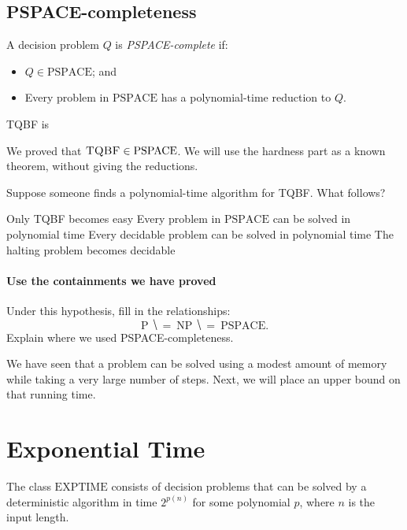 \documentclass[11  pt]{article}
\begin{document}
\newpage
\subsection*{PSPACE-completeness}
A decision problem $Q$ is \emph{PSPACE-complete} if:
\begin{itemize}
    \item $Q\in\mathrm{PSPACE}$; and
    \item Every problem in $\mathrm{PSPACE}$ has a polynomial-time reduction to $Q$.
\end{itemize}

\begin{theorem}
    \textsc{TQBF} is 
\end{theorem}
We proved that $\textsc{TQBF}\in\mathrm{PSPACE}$. We will use the hardness part as a known theorem, without giving the reductions.

\begin{Qu}
    Suppose someone finds a polynomial-time algorithm for \textsc{TQBF}. What follows?
    \begin{itemize}
        \aitem Only \textsc{TQBF} becomes easy
        \bitem Every problem in $\mathrm{PSPACE}$ can be solved in polynomial time
        \citem Every decidable problem can be solved in polynomial time
        \ditem The halting problem becomes decidable
    \end{itemize}
\end{Qu}

\paragraph{Use the containments we have proved}
Under this hypothesis, fill in the relationships:
\begin{equation*}
    \mathrm{P}\ \hide{=}\ \mathrm{NP}\ \hide{=}\ \mathrm{PSPACE}.
\end{equation*}
Explain where we used PSPACE-completeness.
\vs{1.5cm}

\vfill
We have seen that a problem can be solved using a modest amount of memory while taking a very large number of steps. Next, we will place an upper bound on that running time.

\newpage
\section{Exponential Time}
The class $\mathrm{EXPTIME}$ consists of decision problems that can be solved by a deterministic algorithm in time $2^{p(n)}$ for some polynomial $p$, where $n$ is the input length.
\end{document}
